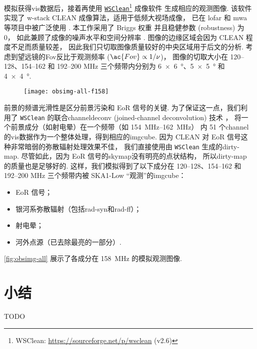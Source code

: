 模拟获得\ac{vis}数据后，接着再使用
\href{https://sourceforge.net/p/wsclean}{\texttt{WSClean}}\footnote{%
  WSClean: \url{https://sourceforge.net/p/wsclean} (v2.6)}
成像软件\cite{offringa2014}
生成相应的观测图像.
该软件实现了 \ac{w-stack} CLEAN 成像算法，适用于低频大视场成像，
已在 \ac{lofar} 和 \ac{mwa} 等项目中被广泛使用 \cite{offringa2014,offringa2017}.
本工作采用了 Briggs 权重\cite{briggs1995}
并且稳健参数 (robustness) 为 0，
如此兼顾了成像的噪声水平和空间分辨率 \cite{briggs1995}.
图像的边缘区域会因为 CLEAN 程度不足而质量较差，
因此我们只切取图像质量较好的中央区域用于后文的分析.
考虑到望远镜的\acl{Fov}反比于观测频率 ($\ac{Fov} \propto 1/\nu$)，
图像的切取大小在 \numrange{120}{128}、\numrange{154}{162} 和
\numrange{192}{200} \si{\MHz} 三个频带内分别为
\SI{6 x 6}{\degree}、\SI{5 x 5}{\degree} 和 \SI{4 x 4}{\degree}.

\begin{figure}[htp]
  \centering
  \texttt{[image: obsimg-all-f158]}
  \label{fig:obsimg-all}
\end{figure}

前景的频谱光滑性是区分前景污染和 EoR 信号的关键.
为了保证这一点，我们利用了 \texttt{WSClean} 的联合\ac{channel}\ac{deconv}
(joined-channel deconvolution) 技术 \cite{offringa2017}，
将一个前景成分（如射电晕）在一个频带（如 \SIrange{154}{162}{\MHz}）
内 51 个\ac{channel}的\ac{vis}数据作为一个整体处理，得到相应的\ac{imgcube}.
因为 CLEAN 对 EoR 信号这种非常暗弱的弥散辐射处理效果不佳，
我们直接使用由 \texttt{WSClean} 生成的\ac{dirty-map}.
尽管如此，因为 EoR 信号的\ac{skymap}没有明亮的点状结构，
所以\ac{dirty-map}的质量也是足够好的.
这样，我们模拟得到了以下成分在 \numrange{120}{128}、\numrange{154}{162}
和 \numrange{192}{200} \si{\MHz} 三个频带内被
SKA1-Low \enquote{观测}的\ac{imgcube}：
\begin{itemize}
  \item EoR 信号；
  \item 银河系弥散辐射（包括\ac{rad-syn}和\ac{rad-ff}）；
  \item 射电晕；
  \item 河外点源（已去除最亮的一部分）.
\end{itemize}
\autoref{fig:obsimg-all} 展示了各成分在 \SI{158}{\MHz} 的模拟观测图像.


\section{小结}

TODO


